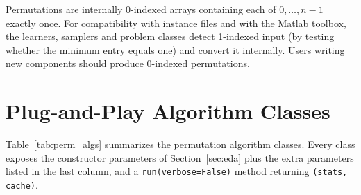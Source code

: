 \documentclass[a4paper,11pt]{article}
\begin{document}
Permutations are internally 0-indexed arrays containing each of
$0,\ldots,n-1$ exactly once.  For compatibility with instance files and with the
Matlab toolbox, the learners, samplers and problem classes detect 1-indexed
input (by testing whether the minimum entry equals one) and convert it
internally.  Users writing new components should produce 0-indexed
permutations.

\section{Plug-and-Play Algorithm Classes}
\label{sec:algorithms}

Table~\ref{tab:perm_algs} summarizes the permutation algorithm classes.  Every
class exposes the constructor parameters of Section~\ref{sec:eda} plus the
extra parameters listed in the last column, and a \texttt{run(verbose=False)}
method returning \texttt{(stats, cache)}.
\end{document}
